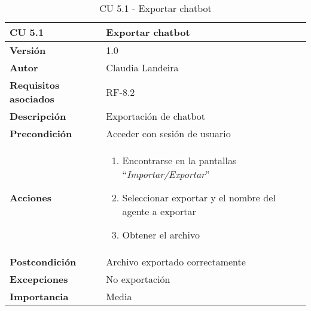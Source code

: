 \begin{table}[p]
	\centering
	\begin{tabularx}{\linewidth}{ p{} p{} }
		\toprule
		\textbf{CU 5.1}    & \textbf{Exportar chatbot}\\
		\toprule
		\textbf{Versión}              & 1.0    \\
		\textbf{Autor}                & Claudia Landeira \\
		\textbf{Requisitos asociados} & RF-8.2\\
		\textbf{Descripción}          & Exportación de chatbot\\
		\textbf{Precondición}         & Acceder con sesión de usuario\\
		\textbf{Acciones}             &
		\begin{enumerate}
			\def\labelenumi{\arabic{enumi}.}
			\tightlist
                \item Encontrarse en la pantallas ``\textit{Importar/Exportar}''
			\item Seleccionar exportar y el nombre del agente a exportar
			\item Obtener el archivo
		\end{enumerate}\\
		\textbf{Postcondición}        & Archivo exportado correctamente \\
		\textbf{Excepciones}          & No exportación \\
		\textbf{Importancia}          & Media \\
		\bottomrule
	\end{tabularx}
	\caption{CU 5.1 - Exportar chatbot}
\end{table}

